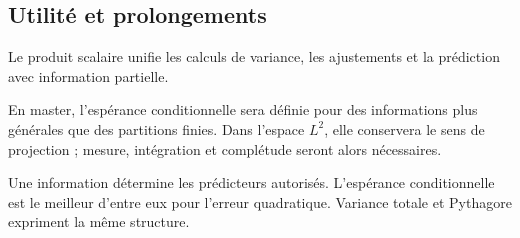 \documentclass[../cours_1re.tex]{subfiles}
\begin{document}
\begin{finchapitre}
\section{Utilité et prolongements}
Le produit scalaire unifie les calculs de variance, les ajustements et
la prédiction avec information partielle.

En master, l'espérance conditionnelle sera définie pour des informations plus
générales que des partitions finies. Dans l'espace $L^2$, elle conservera
le sens de projection ; mesure, intégration et complétude seront alors nécessaires.
\begin{retenir}
Une information détermine les prédicteurs autorisés. L'espérance conditionnelle
est le meilleur d'entre eux pour l'erreur quadratique. Variance totale et Pythagore expriment la même structure.
\end{retenir}
\end{finchapitre}
\end{document}
